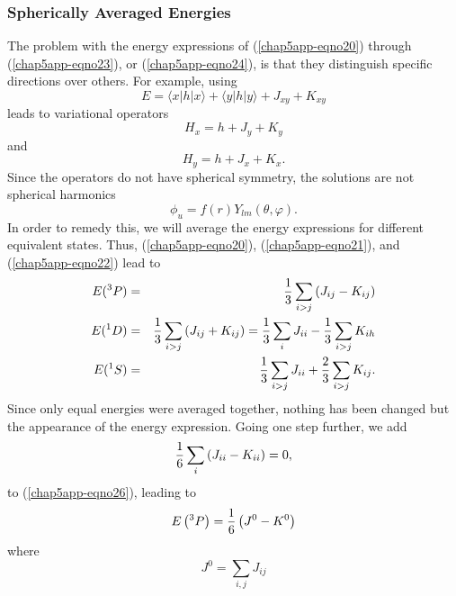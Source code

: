 \subsubsection{Spherically Averaged Energies}

The problem with the energy expressions of (\ref{chap5app-eqno20})
through (\ref{chap5app-eqno23}), or (\ref{chap5app-eqno24}),  
is that they distinguish specific directions over others. For example, 
using
\begin{equation}
E = \langle x | h | x \rangle + \langle y | h | y \rangle + J_{xy} + 
K_{xy}
\end{equation}
leads to variational operators
\begin{equation}
H_x = h + J_y + K_y
\end{equation}
and
\begin{equation}
H_y = h + J_x + K_x.
\end{equation}
Since the operators do not have spherical symmetry, the solutions are 
not spherical harmonics
\begin{equation}
\phi_u = f ( r ) Y_{lm} \left( \theta , \varphi \right) .
\end{equation}
In order to remedy this, we will average the energy expressions for 
different equivalent states.  Thus, (\ref{chap5app-eqno20}),
(\ref{chap5app-eqno21}), and (\ref{chap5app-eqno22}) lead to 
\begin{eqnarray}
E ( {^3P} ) &=& {1 \over 3} \sum_{i>j} \left( J_{ij} - K_{ij}\right)\\
E ( {^1D} ) &=& {1 \over 3} \sum_{i>j} \left( J_{ij} + K_{ij}\right) 
= {1 \over 3} \sum_{i} J_{ii} - {1 \over 3} \sum_{i>j} K_{ih}\\
E ( {^1S} ) &=& {1 \over 3} \sum_{i>j} J_{ii} + {2 \over 3} \sum_{i>j} 
K_{ij} .
\label{chap5app-eqno26}
\end{eqnarray}
Since only equal energies were averaged together, nothing has been 
changed but the appearance of the energy expression.  Going one step 
further, we add
\begin{equation}
{1 \over 6} \sum_{i} \left( J_{ii} - K_{ii} \right) = 0 ,
\label{chap5app-eqno29}
\end{equation}
to (\ref{chap5app-eqno26}), leading to
\begin{equation}
E \left( {^3P} \right) = {1 \over 6} \left( J^0 - K^0 \right)
\label{chap5app-eqno30}
\end{equation}
where
\begin{equation}
J^0 = \sum_{i,j} J_{ij}
\label{chap5app-eqno31a}
\end{equation}
